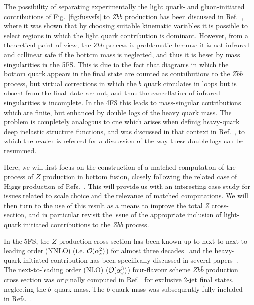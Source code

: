 \documentclass[12pt]{article}
\newcommand{\order}[1]{{\cal O}(#1)}
\begin{document}
The possibility of
separating experimentally the light quark- and gluon-initiated
contributions of Fig.~\ref{fig:fusvsfs} to $Zb\bar b$ production
has been discussed in
Ref.~\cite{Chatrchyan:2013zja}, where it was shown that by choosing
suitable kinematic variables it is possible to select regions in
which the light quark contribution is dominant. However, from a theoretical
point of view, the  $Zb\bar b$ process is problematic because it is not
infrared and collinear safe if the bottom mass is neglected, and thus
it is beset by mass singularities in the 5FS. This is due to the fact
that diagrams in which the bottom quark appears in the final state are
counted as contributions to the  $Zb\bar b$ process, but virtual corrections in
which the $b$ quark circulates in loops but is absent from  the final state
are not, and thus the cancellation of infrared singularities is
incomplete. In the 4FS this leads to mass-singular contributions
which are finite, but enhanced by double logs of the heavy quark
mass. The problem is completely analogous to one which arises when
definig heavy-quark deep inelastic structure functions, and was
discussed in that context in Ref.~\cite{Forte:2010ta}, to which the
reader is referred for a discussion of the way these double logs can
be resummed. 

Here, we will first focus on the construction of a matched computation
of the process of $Z$ production in bottom fusion, closely following
the related case of Higgs production of
Refs.~\cite{Forte:2015hba,Forte:2016sja}. This will provide us with an
interesting case study for issues related to scale choice and the
relevance of matched computations. 
We will then turn to the use of this result as a means to improve the
total $Z$ cross-section, and in particular revisit the issue of the
appropriate inclusion of light-quark initiated contributions to the
$Zb\bar b$ process.

In the 5FS, the $Z$-production cross section has been known up to
next-to-next-to leading order
(NNLO) (i.e. $\order{\alpha_s^2}$) for almost three decades~\cite{Hamberg:1990np} and 
the heavy-quark initiated contribution has been specifically discussed
in 
several papers~\cite{Rijken:1995gi,Stelzer:1997ns,Maltoni:2005wd}.
%
The next-to-leading order (NLO) ($\order{\alpha_s^3}$) four-flavour scheme
$Zb\bar{b}$ production cross section was originally computed 
in Ref.~\cite{Campbell:2000bg} 
for exclusive 2-jet final states, neglecting the $b$~quark mass. 
The $b$-quark mass was subsequently fully included in
Refs.~\cite{FebresCordero:2008ci,Cordero:2009kv}.
\end{document}
